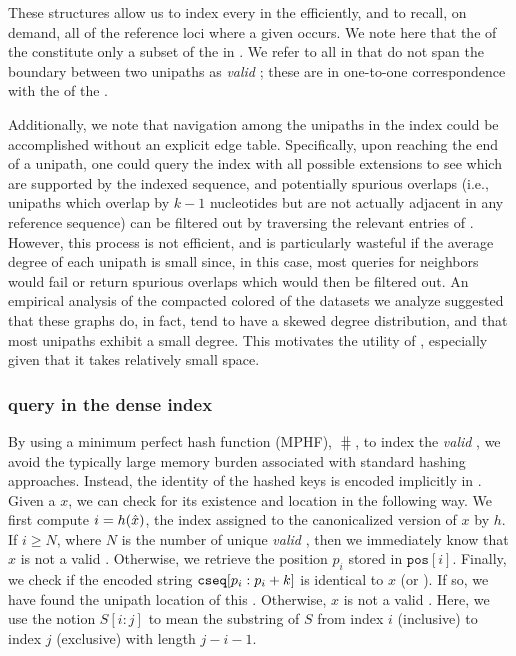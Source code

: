   These structures allow us to index every \kmer in the \ccdbg efficiently, and to
  recall, on demand, all of the reference loci where a given \kmer occurs. We note
  here that the \kmers of the \ccdbg constitute only a subset of the \kmers in
  \cseq. We refer to all \kmers in \cseq that do not span the boundary between two
  unipaths as \emph{valid} \kmers; these are in one-to-one correspondence with the
  \kmers of the \ccdbg.

  Additionally, we note that navigation among the unipaths in the index could be
  accomplished without an explicit edge table. Specifically, upon reaching the end
  of a unipath, one could query the index with all possible extensions to see
  which are supported by the indexed sequence, and potentially spurious overlaps
  (i.e., unipaths which overlap by $k-1$ nucleotides but are not actually
  adjacent in any reference sequence) can be filtered out by traversing the
  relevant entries of \ctab. However, this process is not efficient, and is
  particularly wasteful if the average degree of each unipath is small since, in
  this case, most queries for neighbors would fail or return spurious overlaps
  which would then be filtered out. An empirical analysis of the compacted colored
  \dbg of the datasets we analyze suggested that these graphs do, in fact, tend to
  have a skewed degree distribution, and that most unipaths exhibit a small
  degree.
  This motivates the utility of \etab, especially given that it takes
  relatively small space.

  \subsubsection*{\kmer query in the dense \pufferfish index} \label{subsec:dense}
  By using a minimum perfect hash function (MPHF), $\hash$, to index the
  \emph{valid} \kmers, we avoid the typically large memory burden associated with
  standard hashing approaches. Instead, the identity of the hashed keys is encoded
  implicitly in \cseq. Given a \kmer $x$, we can check for its existence and
  location in the following way. We first compute $i = h(\hat{x})$, the index
  assigned to the canonicalized version of \kmer $x$ by $h$. If $i \ge N$, where
  $N$ is the number of unique \emph{valid} \kmers, then we immediately know that
  $x$ is not a valid \kmer. Otherwise, we retrieve the position $p_{i}$ stored in
  $\texttt{pos}[i]$. Finally, we check if the encoded string
  $\texttt{cseq}[p_{i}:p_{i}+k]$ is identical to $x$ (or ). If so, we have found the
  unipath location of this \kmer. Otherwise, $x$ is not a valid \kmer. Here, we
  use the notion $S[i:j]$ to mean the substring of $S$ from index $i$ (inclusive)
  to index $j$ (exclusive) with length $j-i-1$.

